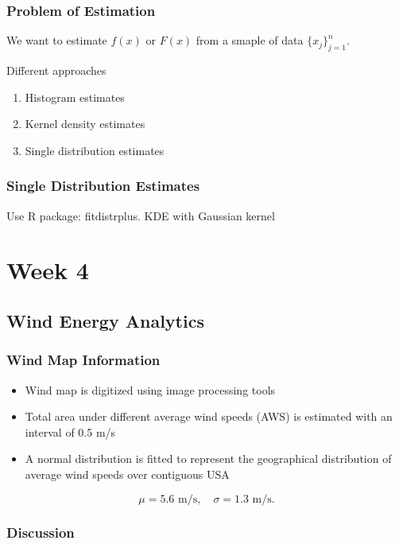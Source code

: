 \documentclass[12pt, a4paper]{report}
\begin{document}
  \section{Problem of Estimation}

  We want to estimate $ f(x) $ or $ F(x) $ from a smaple of data $ \{x_j\}_{j=1}^n. $

  Different approaches

  \begin{enumerate}
    \item Histogram estimates
    \item Kernel density estimates
    \item Single distribution estimates
  \end{enumerate}

  \section{Single Distribution Estimates}

  Use R package: fitdistrplus. KDE with Gaussian kernel

  \part{Week 4}

  \chapter{Wind Energy Analytics}

  \section{Wind Map Information}

  \begin{itemize}
    \item Wind map is digitized using image processing tools
    \item Total area under different average wind speeds (AWS) is estimated with an interval of 0.5 m/s
    \item A normal distribution is fitted to represent the geographical distribution of average wind speeds over contiguous USA
  \end{itemize}

  \[
      \mu = 5.6 \text{ m/s}, \quad \sigma = 1.3 \text{ m/s}
    .\]

  \section{Discussion}
\end{document}
